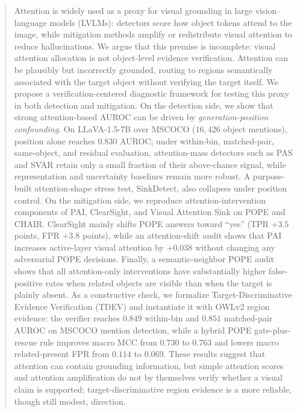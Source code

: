 \begin{abstract}
Attention is widely used as a proxy for visual grounding in large vision--language models (LVLMs): detectors score how object tokens attend to the image, while mitigation methods amplify or redistribute visual attention to reduce hallucinations. We argue that this premise is incomplete: visual attention allocation is not object-level evidence verification. Attention can be plausibly but incorrectly grounded, routing to regions semantically associated with the target object without verifying the target itself. We propose a verification-centered diagnostic framework for testing this proxy in both detection and mitigation. On the detection side, we show that strong attention-based AUROC can be driven by \emph{generation-position confounding}. On LLaVA-1.5-7B over MSCOCO ($16{,}426$ object mentions), position alone reaches $0.830$ AUROC; under within-bin, matched-pair, same-object, and residual evaluation, attention-mass detectors such as PAS and SVAR retain only a small fraction of their above-chance signal, while representation and uncertainty baselines remain more robust. A purpose-built attention-shape stress test, SinkDetect, also collapses under position control. On the mitigation side, we reproduce attention-intervention components of PAI, ClearSight, and Visual Attention Sink on POPE and CHAIR. ClearSight mainly shifts POPE answers toward ``yes'' (TPR $+3.5$ points, FPR $+3.8$ points), while an attention-shift audit shows that PAI increases active-layer visual attention by $+0.038$ without changing any adversarial POPE decisions. Finally, a semantic-neighbor POPE audit shows that all attention-only interventions have substantially higher false-positive rates when related objects are visible than when the target is plainly absent. As a constructive check, we formalize Target-Discriminative Evidence Verification (TDEV) and instantiate it with OWLv2 region evidence: the verifier reaches $0.849$ within-bin and $0.851$ matched-pair AUROC on MSCOCO mention detection, while a hybrid POPE gate-plus-rescue rule improves macro MCC from $0.730$ to $0.763$ and lowers macro related-present FPR from $0.114$ to $0.069$. These results suggest that attention can contain grounding information, but simple attention scores and attention amplification do not by themselves verify whether a visual claim is supported; target-discriminative region evidence is a more reliable, though still modest, direction.
\end{abstract}
